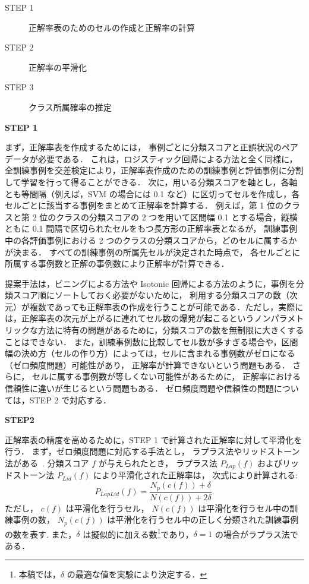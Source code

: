 \documentclass[japanese]{jnlp_1.4}
\begin{document}
\begin{description}
\item[STEP 1]
正解率表のためのセルの作成と正解率の計算 

\item[STEP 2]
正解率の平滑化

\item[STEP 3]
クラス所属確率の推定
\end{description}

\vspace{1\baselineskip}
\noindent
{\bf STEP 1}

まず，正解率表を作成するためには，
事例ごとに分類スコアと正誤状況のペアデータが必要である．
これは，ロジスティック回帰による方法と全く同様に，全訓練事例を交差検定により，正解率表作成のための訓練事例と評価事例に分割して学習を行って得ることができる．
次に，用いる分類スコアを軸とし，各軸とも等間隔（例えば，SVM の場合には 0.1 など）に区切ってセルを作成し，各セルごとに該当する事例をまとめて正解率を計算する．
例えば，第 1 位のクラスと第 2 位のクラスの分類スコアの 2 つを用いて区間幅 0.1 とする場合，縦横ともに 0.1 間隔で区切られたセルをもつ長方形の正解率表となるが，
訓練事例中の各評価事例における 2 つのクラスの分類スコアから，どのセルに属するかが決まる．
すべての訓練事例の所属先セルが決定された時点で，
各セルごとに所属する事例数と正解の事例数により正解率が計算できる．

提案手法は，ビニングによる方法や Isotonic 回帰による方法のように，事例を分類スコア順にソートしておく必要がないために，
利用する分類スコアの数（次元）が複数であっても正解率表の作成を行うことが可能である．ただし，実際には，正解率表の次元が上がるに連れてセル数の爆発が起こるというノンパラメトリックな方法に特有の問題があるために，分類スコアの数を無制限に大きくすることはできない．
また，訓練事例数に比較してセル数が多すぎる場合や，区間幅の決め方（セルの作り方）によっては，セルに含まれる事例数がゼロになる（ゼロ頻度問題）可能性があり，
正解率が計算できないという問題もある．
さらに，
セルに属する事例数が等しくない可能性があるために，
正解率における信頼性に違いが生じるという問題もある．
ゼロ頻度問題や信頼性の問題については，STEP 2 で対応する．
\vspace{1\baselineskip}\par
\noindent
{\bf STEP2}

正解率表の精度を高めるために，STEP 1 で計算された正解率に対して平滑化を行う．
まず，ゼロ頻度問題に対応する手法とし，
ラプラス法やリッドストーン法がある~\cite{Kita99_j}. 
分類スコア $f$ が与えられたとき，
ラプラス法 $P_{Lap}(f)$ およびリッドストーン法 $P_{Lid}(f)$ により平滑化された正解率は，
次式により計算される: 
\begin{equation}
P_{LapLid}(f)=\frac{N_{p}(c(f))+\delta} {N(c(f))+2\delta}.
\end{equation} 
ただし，
 $c(f)$ は平滑化を行うセル，
$N(c(f))$ は平滑化を行うセル中の訓練事例の数，
$N_{p}(c(f))$ は平滑化を行うセル中の正しく分類された訓練事例の数を表す.
また，$\delta$ は擬似的に加える数\footnote{
	本稿では，$\delta$ の最適な値を実験により決定する．
}であり，$\delta=1$ の場合がラプラス法である．
\end{document}
